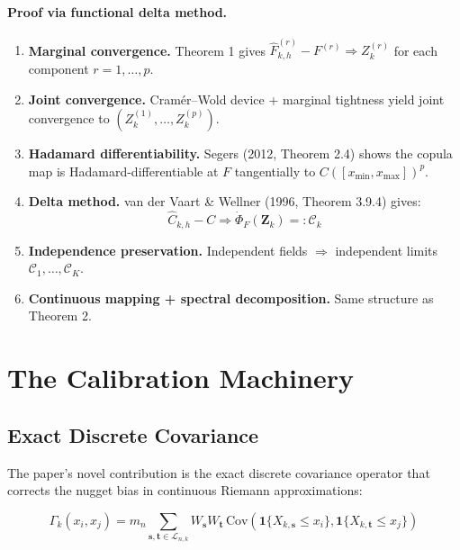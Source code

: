 \documentclass[11pt,a4paper]{article}
\theoremstyle{definition}
\begin{document}
\paragraph{Proof via functional delta method.}
\begin{enumerate}
\item \textbf{Marginal convergence.} Theorem 1 gives $\hat{F}_{k,h}^{(r)} - F^{(r)} \Rightarrow Z_k^{(r)}$ for each component $r = 1, \dots, p$.

\item \textbf{Joint convergence.} Cram\'{e}r--Wold device + marginal tightness yield joint convergence to $(Z_k^{(1)}, \dots, Z_k^{(p)})$.

\item \textbf{Hadamard differentiability.} Segers (2012, Theorem 2.4) shows the copula map is Hadamard-differentiable at $F$ tangentially to $C([x_{\min}, x_{\max}])^p$.

\item \textbf{Delta method.} van der Vaart \& Wellner (1996, Theorem 3.9.4) gives:
\[
\hat{C}_{k,h} - C \Rightarrow \dot{\Phi}_F(\mathbf{Z}_k) =: \mathcal{C}_k
\]

\item \textbf{Independence preservation.} Independent fields $\Rightarrow$ independent limits $\mathcal{C}_1, \dots, \mathcal{C}_K$.

\item \textbf{Continuous mapping + spectral decomposition.} Same structure as Theorem 2.
\end{enumerate}

\section{The Calibration Machinery}
\label{sec:calibration}

\subsection{Exact Discrete Covariance}

The paper's novel contribution is the exact discrete covariance operator that corrects the nugget bias in continuous Riemann approximations:

\begin{equation}
\label{eq:exact-cov}
\Gamma_k(x_i, x_j) = m_n \sum_{\mathbf{s}, \mathbf{t} \in \mathcal{L}_{n,k}} W_{\mathbf{s}} W_{\mathbf{t}} \, \text{Cov}\left(\mathbf{1}\{X_{k,\mathbf{s}} \leq x_i\}, \mathbf{1}\{X_{k,\mathbf{t}} \leq x_j\}\right)
\end{equation}
\end{document}
